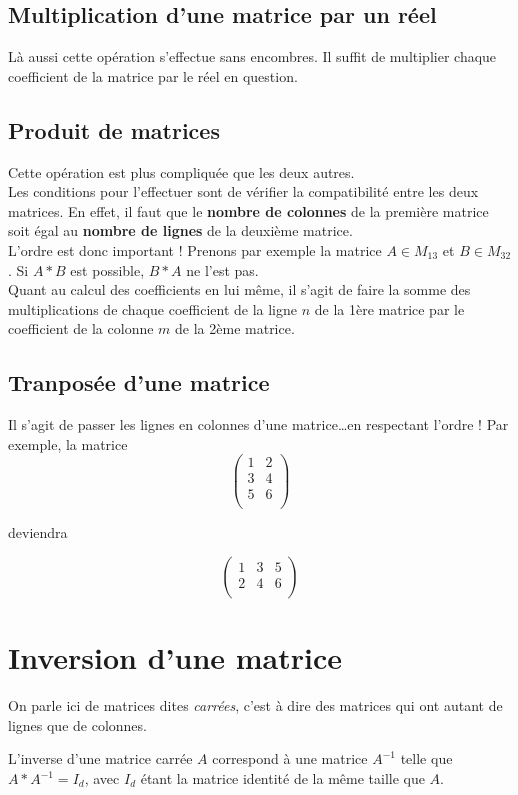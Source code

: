 \documentclass{report}
\begin{document}
\subsection{Multiplication d'une matrice par un réel}
Là aussi cette opération s'effectue sans encombres.
Il suffit de multiplier chaque coefficient de la matrice par le réel en question.

\subsection{Produit de matrices}
Cette opération est plus compliquée que les deux autres.\\
Les conditions pour l'effectuer sont de vérifier la compatibilité entre les deux matrices.
En effet, il faut que le \textbf{nombre de colonnes} de la première matrice soit égal au \textbf{nombre de lignes} de la deuxième matrice.\\
L'ordre est donc important !
Prenons par exemple la matrice $A \in M_{13}$ et $B \in M_{32}$.
Si $A * B$ est possible, $B * A$ ne l'est pas.\\
Quant au calcul des coefficients en lui même, il s'agit de faire la somme des multiplications de chaque coefficient de la ligne $n$ de la 1ère matrice par le coefficient de la colonne $m$ de la 2ème matrice.

\subsection{Tranposée d'une matrice}
Il s'agit de passer les lignes en colonnes d'une matrice\ldots en respectant l'ordre !
Par exemple, la matrice 
\[
\begin{pmatrix}
   1 & 2\\
   3 & 4\\
   5 & 6\\ 
\end{pmatrix}
\]
\begin{center}deviendra\end{center}
\[
\begin{pmatrix}
   1 & 3 & 5\\
   2 & 4 & 6\\
\end{pmatrix}
\]
\section{Inversion d'une matrice}
On parle ici de matrices dites \emph{carrées}, c'est à dire des matrices qui ont autant de lignes que de colonnes.
\par
L'inverse d'une matrice carrée $A$ correspond à une matrice $A^{-1}$ telle que $A * A^{-1} = I_d$, avec $I_d$ étant la matrice identité de la même taille que $A$.
\end{document}
